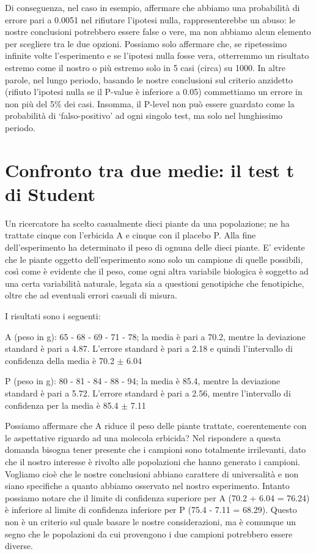 \documentclass[a4paper,12pt,oneside]{book}
\theoremstyle{definition}
\theoremstyle{definition}
\theoremstyle{definition}
\theoremstyle{remark}
\begin{document}
Di conseguenza, nel caso in esempio, affermare che abbiamo una
probabilità di errore pari a 0.0051 nel rifiutare l'ipotesi nulla,
rappresenterebbe un abuso: le nostre conclusioni potrebbero essere false
o vere, ma non abbiamo alcun elemento per scegliere tra le due opzioni.
Possiamo solo affermare che, se ripetessimo infinite volte l'esperimento
e se l'ipotesi nulla fosse vera, otterremmo un risultato estremo come il
nostro o più estremo solo in 5 casi (circa) su 1000. In altre parole,
nel lungo periodo, basando le nostre conclusioni sul criterio anzidetto
(rifiuto l'ipotesi nulla se il P-value è inferiore a 0.05) commettiamo
un errore in non più del 5\% dei casi. Insomma, il P-level non può
essere guardato come la probabilità di `falso-positivo' ad ogni singolo
test, ma solo nel lunghissimo periodo.

\section{Confronto tra due medie: il test t di
Student}\label{confronto-tra-due-medie-il-test-t-di-student}

Un ricercatore ha scelto casualmente dieci piante da una popolazione; ne
ha trattate cinque con l'erbicida A e cinque con il placebo P. Alla fine
dell'esperimento ha determinato il peso di ognuna delle dieci piante. E'
evidente che le piante oggetto dell'esperimento sono solo un campione di
quelle possibili, così come è evidente che il peso, come ogni altra
variabile biologica è soggetto ad una certa variabilità naturale, legata
sia a questioni genotipiche che fenotipiche, oltre che ad eventuali
errori casuali di misura.

I risultati sono i seguenti:

A (peso in g): 65 - 68 - 69 - 71 - 78; la media è pari a 70.2, mentre la
deviazione standard è pari a 4.87. L'errore standard è pari a 2.18 e
quindi l'intervallo di confidenza della media è 70.2 \(\pm\) 6.04

P (peso in g): 80 - 81 - 84 - 88 - 94; la media è 85.4, mentre la
deviazione standard è pari a 5.72. L'errore standard è pari a 2.56,
mentre l'intervallo di confidenza per la media è 85.4 \(\pm\) 7.11

Possiamo affermare che A riduce il peso delle piante trattate,
coerentemente con le aspettative riguardo ad una molecola erbicida? Nel
rispondere a questa domanda bisogna tener presente che i campioni sono
totalmente irrilevanti, dato che il nostro interesse è rivolto alle
popolazioni che hanno generato i campioni. Vogliamo cioè che le nostre
conclusioni abbiano carattere di universalità e non siano specifiche a
quanto abbiamo osservato nel nostro esperimento. Intanto possiamo notare
che il limite di confidenza superiore per A (70.2 + 6.04 = 76.24) è
inferiore al limite di confidenza inferiore per P (75.4 - 7.11 = 68.29).
Questo non è un criterio sul quale basare le nostre considerazioni, ma è
comunque un segno che le popolazioni da cui provengono i due campioni
potrebbero essere diverse.
\end{document}
